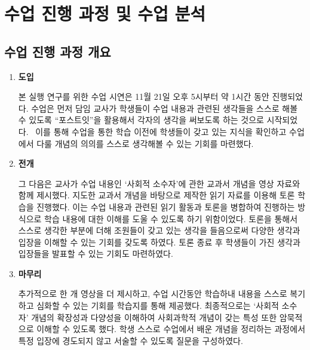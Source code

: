 \documentclass[10pt, a4paper, chapter]{oblivoir}
\begin{document}
\pagebreak

\chapter{수업 진행 과정 및 수업 분석} %
    \section{수업 진행 과정 개요}
    \begin{enumerate}
        \item \textbf{도입}
        
        본 실행 연구를 위한 수업 시연은 11월 21일 오후 5시부터 약 1시간 동안 진행되었다. 수업은 먼저 담임 교사가 학생들이 수업 내용과 관련된 생각들을 스스로 해볼 수 있도록 ``포스트잇''을 활용해서 각자의 생각을 써보도록 하는 것으로 시작되었다.~%
        이를 통해 수업을 통한 학습 이전에 학생들이 갖고 있는 지식을 확인하고 수업에서 다룰 개념의 의의를 스스로 생각해볼 수 있는 기회를 마련했다. 
        \item \textbf{전개}
        
        그 다음은 교사가 수업 내용인 `사회적 소수자'에 관한 교과서 개념을 영상 자료와 함께 제시했다. 지도한 교과서 개념을 바탕으로 제작한 읽기 자료를 이용해 토론 학습을 진행했다. 이는 수업 내용과 관련된 읽기 활동과 토론을 병합하여 진행하는 방식으로 학습 내용에 대한 이해를 도울 수 있도록 하기 위함이었다.
        토론을 통해서 스스로 생각한 부분에 더해 조원들이 갖고 있는 생각을 들음으로써 다양한 생각과 입장을 이해할 수 있는 기회를 갖도록 하였다. 
        토론 종료 후 학생들이 가진 생각과 입장들을 발표할 수 있는 기회도 마련하였다.
        \item \textbf{마무리}
        
        추가적으로 한 개 영상을 더 제시하고, 수업 시간동안 학습하내 내용을 스스로 복기하고 심화할 수 있는 기회를 학습지를 통해 제공했다.
        최종적으로는 `사회적 소수자' 개념의 확장성과 다양성을 이해하여 사회과학적 개념이 갖는 특성 또한 암묵적으로 이해할 수 있도록 했다.
        학생 스스로 수업에서 배운 개념을 정리하는 과정에서 특정 입장에 경도되지 않고 서술할 수 있도록 질문을 구성하였다.
    \end{enumerate}
\end{document}
